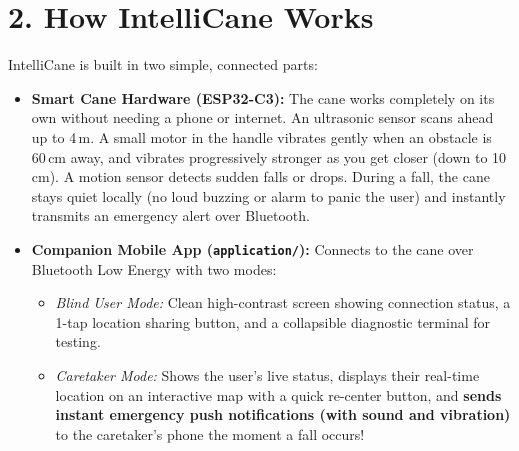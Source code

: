 \documentclass[10pt,a4paper]{article}
\begin{document}
\section{2. How IntelliCane Works}
IntelliCane is built in two simple, connected parts:
\begin{itemize}
    \item \textbf{Smart Cane Hardware (ESP32-C3):} The cane works completely on its own without needing a phone or internet. An ultrasonic sensor scans ahead up to 4\,m. A small motor in the handle vibrates gently when an obstacle is 60\,cm away, and vibrates progressively stronger as you get closer (down to 10\,cm). A motion sensor detects sudden falls or drops. During a fall, the cane stays quiet locally (no loud buzzing or alarm to panic the user) and instantly transmits an emergency alert over Bluetooth.
    \item \textbf{Companion Mobile App (\texttt{application/}):} Connects to the cane over Bluetooth Low Energy with two modes:
    \begin{itemize}
        \item \textit{Blind User Mode:} Clean high-contrast screen showing connection status, a 1-tap location sharing button, and a collapsible diagnostic terminal for testing.
        \item \textit{Caretaker Mode:} Shows the user's live status, displays their real-time location on an interactive map with a quick re-center button, and \textbf{sends instant emergency push notifications (with sound and vibration)} to the caretaker's phone the moment a fall occurs!
    \end{itemize}
\end{itemize}
\end{document}
